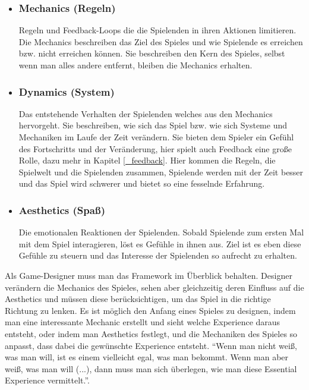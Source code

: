 \begin{itemize}
\item\subsubsection{Mechanics (Regeln)}

Regeln und Feedback-Loops die die Spielenden in ihren Aktionen limitieren. Die Mechanics beschreiben das Ziel des Spieles und wie Spielende es erreichen bzw. nicht erreichen können\cite[S.96]{_art_of_gamedesign}. Sie beschreiben den Kern des Spieles, selbst wenn man alles andere entfernt, bleiben die Mechanics erhalten\cite[S.231]{_art_of_gamedesign}.
 
\item\subsubsection{Dynamics (System)}

Das entstehende Verhalten der Spielenden welches aus den Mechanics hervorgeht\cite{_mda}. Sie beschreiben, wie sich das Spiel bzw. wie sich Systeme und Mechaniken im Laufe der Zeit verändern. Sie bieten dem Spieler ein Gefühl des Fortschritts und der Veränderung, hier spielt auch Feedback eine große Rolle, dazu mehr in Kapitel \ref{_feedback}. Hier kommen die Regeln, die Spielwelt und die Spielenden zusammen, Spielende werden mit der Zeit besser und das Spiel wird schwerer und bietet so eine fesselnde Erfahrung.

\item\subsubsection{Aesthetics (Spaß)}

Die emotionalen Reaktionen der Spielenden. Sobald Spielende zum ersten Mal mit dem Spiel interagieren, löst es Gefühle in ihnen aus. Ziel ist es eben diese Gefühle zu steuern und das Interesse der Spielenden so aufrecht zu erhalten.\newline
\end{itemize}

\noindent Als Game-Designer muss man das Framework im Überblick behalten. Designer verändern die Mechanics des Spieles, sehen aber gleichzeitig deren Einfluss auf die Aesthetics und müssen diese berücksichtigen, um das Spiel in die richtige Richtung zu lenken. Es ist möglich den Anfang eines Spieles zu designen, indem man eine interessante Mechanic erstellt und sieht welche Experience daraus entsteht, oder indem man Aesthetics festlegt, und die Mechaniken des Spieles so anpasst, dass dabei die gewünschte Experience entsteht. "`Wenn man nicht weiß, was man will, ist es einem vielleicht egal, was man bekommt. Wenn man aber weiß, was man will (...), dann muss man sich überlegen, wie man diese Essential Experience vermittelt."'\cite[S.55]{_art_of_gamedesign}.

